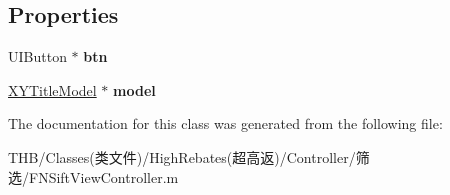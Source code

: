 \subsection*{Properties}
\begin{DoxyCompactItemize}
\item 
\mbox{\label{interface_f_n_sift_view_c_cell_a7185a04ee2a99f5e5a3164c81fe18b92}} 
U\+I\+Button $\ast$ {\bfseries btn}
\item 
\mbox{\label{interface_f_n_sift_view_c_cell_aca8e34343282db696a7905b86c7e9922}} 
\mbox{\hyperlink{interface_x_y_title_model}{X\+Y\+Title\+Model}} $\ast$ {\bfseries model}
\end{DoxyCompactItemize}


The documentation for this class was generated from the following file\+:\begin{DoxyCompactItemize}
\item 
T\+H\+B/\+Classes(类文件)/\+High\+Rebates(超高返)/\+Controller/筛选/F\+N\+Sift\+View\+Controller.\+m\end{DoxyCompactItemize}
